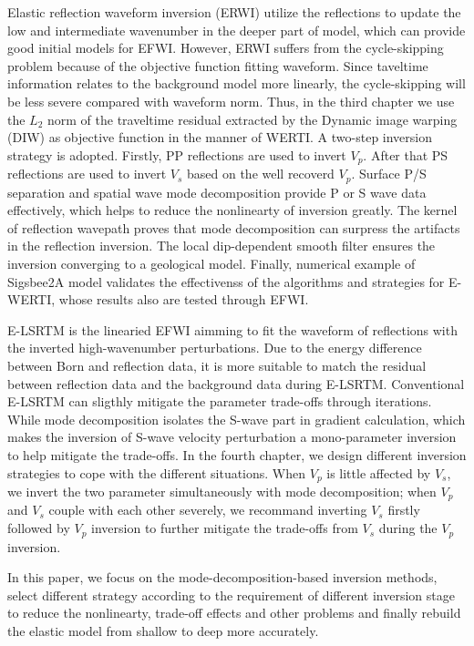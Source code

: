 \begin{eabstract}
Elastic reflection waveform inversion (ERWI) utilize the reflections to update the low and
intermediate wavenumber in the
deeper part of model, which can provide good initial models for EFWI. However, ERWI suffers from
the cycle-skipping problem because of the objective function fitting waveform. Since taveltime
information relates to the background model more linearly, the cycle-skipping will be less severe
compared with waveform norm. Thus, in the third chapter we use the $L_2$ norm of the traveltime
residual extracted by the Dynamic image warping (DIW) as objective function in the manner of
WERTI. 
A two-step inversion strategy is adopted. Firstly, PP reflections are used to invert $V_p$. 
After that PS reflections are used to invert $V_s$ based on the well recoverd $V_p$. Surface P/S
separation and spatial wave mode decomposition provide P or S wave data effectively, which helps
to  reduce the nonlinearty of inversion greatly.
The kernel of reflection wavepath proves that mode decomposition can surpress the artifacts in
the reflection inversion. The local dip-dependent smooth filter ensures the inversion converging to
a
geological model. Finally, numerical example of Sigsbee2A model validates the effectivenss of the 
algorithms and strategies for E-WERTI, whose results also are tested through EFWI.

E-LSRTM is the linearied EFWI aimming to fit the waveform of reflections with the inverted
high-wavenumber perturbations. Due to the energy difference between Born and reflection data, it is
more suitable to match the residual between reflection data and the background data during E-LSRTM.
Conventional
E-LSRTM can sligthly mitigate the parameter trade-offs through iterations. While mode decomposition
isolates the S-wave part in  gradient calculation, which makes the inversion of S-wave velocity
perturbation a mono-parameter inversion to help mitigate the trade-offs. In the fourth chapter, we
design different inversion strategies to cope with the different situations. When $V_p$ is little
affected by $V_s$, we invert the two parameter simultaneously with mode decomposition; when $V_p$
and $V_s$ couple with each
other severely, we recommand inverting $V_s$ firstly followed by $V_p$ inversion to further mitigate
the trade-offs from $V_s$ during the $V_p$ inversion.

In this paper, we focus on the mode-decomposition-based inversion methods, select different strategy
according to the requirement of different inversion stage to reduce the nonlinearty, trade-off
effects and other problems and finally rebuild the elastic model from shallow to
deep more accurately. 

\end{eabstract}

